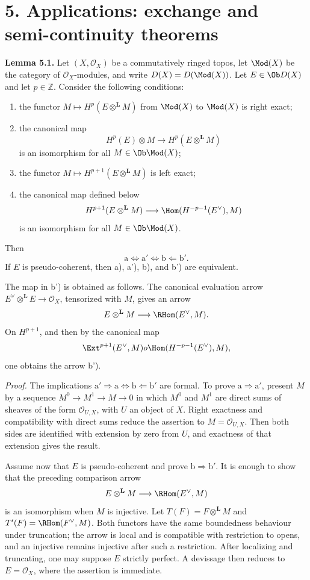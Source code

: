 \section*{5. Applications: exchange and semi-continuity theorems}

\textbf{Lemma 5.1.} Let \((X,\mathcal O_X)\) be a commutatively ringed topos, let \(\Mod(X)\) be the category of \(\mathcal O_X\)-modules, and write \(D(X)=D(\Mod(X))\). Let \(E\in\Ob D(X)\) and let \(p\in\mathbb Z\). Consider the following conditions:
\begin{enumerate}[label=\alph*)]
\item the functor \(M\mapsto H^p(E\otimes^{\mathbf L}M)\) from \(\Mod(X)\) to \(\Mod(X)\) is right exact;
\item[\(\mathrm a'\)] the canonical map
\[
 H^p(E)\otimes M\longrightarrow H^p(E\otimes^{\mathbf L}M)
\]
is an isomorphism for all \(M\in\Ob\Mod(X)\);
\item[\(\mathrm b\)] the functor \(M\mapsto H^{p+1}(E\otimes^{\mathbf L}M)\) is left exact;
\item[\(\mathrm b'\)] the canonical map defined below
\[
 H^{p+1}(E\otimes^{\mathbf L}M)
 \longrightarrow
 \Hom(H^{-p-1}(E^{\vee}),M)
\]
is an isomorphism for all \(M\in\Ob\Mod(X)\).
\end{enumerate}
Then
\[
 \mathrm a\Longleftrightarrow \mathrm a'
 \Longleftrightarrow \mathrm b
 \Longleftarrow \mathrm b'.
\]
If \(E\) is pseudo-coherent, then a), a'), b), and b') are equivalent.

The map in b') is obtained as follows. The canonical evaluation arrow \(E^{\vee}\otimes^{\mathbf L}E\to\mathcal O_X\), tensorized with \(M\), gives an arrow
\[
 E\otimes^{\mathbf L}M\longrightarrow\RHom(E^{\vee},M).
\]
On \(H^{p+1}\), and then by the canonical map
\[
 \Ext^{p+1}(E^{\vee},M)	o\Hom(H^{-p-1}(E^{\vee}),M),
\]
one obtains the arrow b').

\emph{Proof.} The implications \(\mathrm a'\Rightarrow\mathrm a\Leftrightarrow\mathrm b\Leftarrow\mathrm b'\) are formal. To prove \(\mathrm a\Rightarrow\mathrm a'\), present \(M\) by a sequence \(M^0\to M^1\to M\to0\) in which \(M^0\) and \(M^1\) are direct sums of sheaves of the form \(\mathcal O_{U,X}\), with \(U\) an object of \(X\). Right exactness and compatibility with direct sums reduce the assertion to \(M=\mathcal O_{U,X}\). Then both sides are identified with extension by zero from \(U\), and exactness of that extension gives the result.

Assume now that \(E\) is pseudo-coherent and prove \(\mathrm b\Rightarrow\mathrm b'\). It is enough to show that the preceding comparison arrow
\[
 E\otimes^{\mathbf L}M\longrightarrow\RHom(E^{\vee},M)
\]
is an isomorphism when \(M\) is injective. Let \(T(F)=F\otimes^{\mathbf L}M\) and \(T'(F)=\RHom(F^{\vee},M)\). Both functors have the same boundedness behaviour under truncation; the arrow is local and is compatible with restriction to opens, and an injective remains injective after such a restriction. After localizing and truncating, one may suppose \(E\) strictly perfect. A devissage then reduces to \(E=\mathcal O_X\), where the assertion is immediate.

